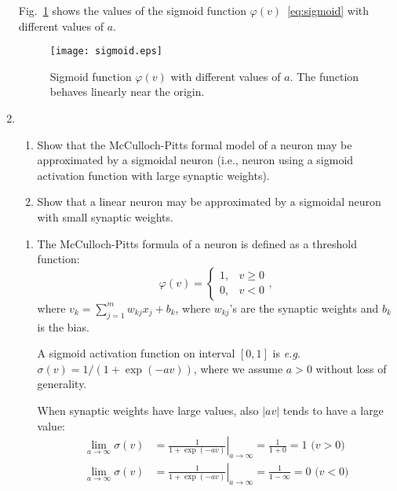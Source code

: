 \begin{enumerate}
\begin{solution}
    Fig.~\ref{fig:sigmoid} shows the values of the sigmoid
    function $\varphi(v)$~\eqref{eq:sigmoid} with different values of $a$.

    \begin{figure}[h]
      \begin{center}
        \texttt{[image: sigmoid.eps]}
        \caption{\label{fig:sigmoid} Sigmoid function $\varphi(v)$ with
          different values of $a$. The function behaves linearly near the
          origin.}
      \end{center}
    \end{figure}

  \end{solution}
  
  
\item

  \begin{enumerate}
  \item Show that the McCulloch-Pitts formal model
    of a neuron may be approximated by a sigmoidal neuron (i.e.,
    neuron using a sigmoid activation function with large synaptic
    weights).
  \item Show that a linear neuron may be approximated by a sigmoidal
    neuron with small synaptic weights.
  \end{enumerate}
  
  \begin{solution}

    \begin{enumerate}
      
    \item The McCulloch-Pitts formula of a neuron is
      defined as a threshold function:
      \begin{equation}
        \varphi(v) = \left\{ \begin{array}{rl} 1, & v \geq 0 \\ 0, & v <
            0 \end{array} \right.,
      \end{equation}
      where $v_k = \sum_{j=1}^{m} w_{kj} x_j + b_k$, where $w_{kj}$'s are
      the synaptic weights and $b_k$ is the bias.
      
      A sigmoid activation function on interval $[0,1]$ is {\em e.g.}
      $\sigma(v) = 1 / (1 + \exp(-av))$, where we assume $a > 0$ without
      loss of generality.
      
      When synaptic weights have large values, also $|a v|$ tends to have
      a large value:
      \begin{equation}
        \begin{aligned}
          \lim_{a \rightarrow \infty} \sigma(v)& = \left. \frac{1}{1 +
              \exp(-av)}\right|_{a \rightarrow \infty} = \frac{1}{1+0} = 1 \mbox{\ \ \ \ \ \ ($v>0$)}
          \\
          \lim_{a \rightarrow \infty} \sigma(v)& = \left. \frac{1}{1 +
              \exp(-av)}\right|_{a \rightarrow \infty} =
          \frac{1}{1-\infty} = 0 \mbox{\ \ \ \ \ ($v<0$)}
        \end{aligned}
      \end{equation}
      

\end{enumerate}
\end{solution}
\end{enumerate}
